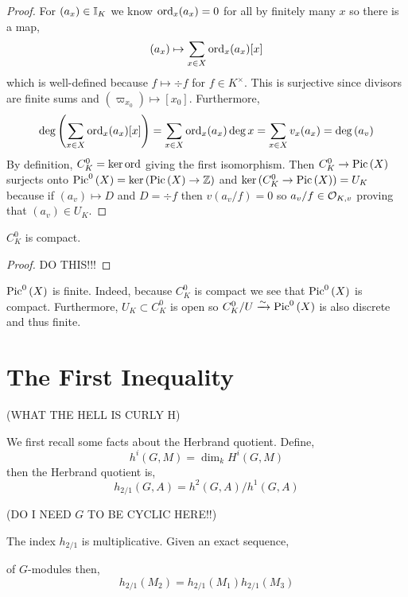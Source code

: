 \documentclass[12pt]{article}
\begin{document}
\begin{proof}
For $(a_x) \in \mathbb{I}_K$ we know $\operatorname{\mathrm{ord}}_x(a_x) = 0$ for all by finitely many $x$ so there is a map,
\[ (a_x) \mapsto \sum_{x \in X} \operatorname{\mathrm{ord}}_x(a_x) [x] \]
which is well-defined because $f \mapsto \div{f}$ for $f \in K^\times$. This is surjective since divisors are finite sums and $(\varpi_{x_0}) \mapsto [x_0]$. Furthermore,
\[ \deg{\left( \sum_{x \in X} \operatorname{\mathrm{ord}}_x(a_x) [x] \right)} = \sum_{x \in X} \operatorname{\mathrm{ord}}_x(a_x) \deg{x} = \sum_{x \in X} v_x(a_x) = \deg{(a_v)} \]
By definition, $C^0_K = \ker{\operatorname{\mathrm{ord}}}$ giving the first isomorphism. Then $C^0_K \to \mathrm{Pic} \left( X \right)$ surjects onto $\mathrm{Pic}^0\left( X \right) = \ker{(\mathrm{Pic} \left( X \right) \to \mathbb{Z})}$ and $\ker{(C^0_K \to \mathrm{Pic} \left( X \right))} = U_K$ because if $(a_v) \mapsto D$ and $D = \div{f}$ then $v(a_v/f) = 0$ so $a_v/f \in \mathcal{O}_{K, v}$ proving that $(a_v) \in U_K$.
\end{proof}

\begin{thm}
$C^0_K$ is compact.
\end{thm}

\begin{proof}
DO THIS!!!
\end{proof}


\begin{cor}
$\mathrm{Pic}^0\left( X \right)$ is finite. Indeed, because $C^0_K$ is compact we see that $\mathrm{Pic}^0\left( X \right)$ is compact. Furthermore, $U_K \subset C^0_K$ is open so $C^0_K / U \xrightarrow{\sim} \mathrm{Pic}^0\left( X \right)$ is also discrete and thus finite. 
\end{cor}

\section{The First Inequality}

(WHAT THE HELL IS CURLY H)

We first recall some facts about the Herbrand quotient. Define,
\[ h^i(G, M) = \dim_k H^i(G, M) \]
then the Herbrand quotient is,
\[ h_{2/1}(G, A) = h^2(G,A)/h^1(G, A) \]

(DO I NEED $G$ TO BE CYCLIC HERE!!)

\begin{prop}
The index $h_{2/1}$ is multiplicative. Given an exact sequence,
\begin{center}
\end{center}
of $G$-modules then,
\[ h_{2/1}(M_2) = h_{2/1}(M_1) h_{2/1}(M_3) \]
\end{prop}
\end{document}
